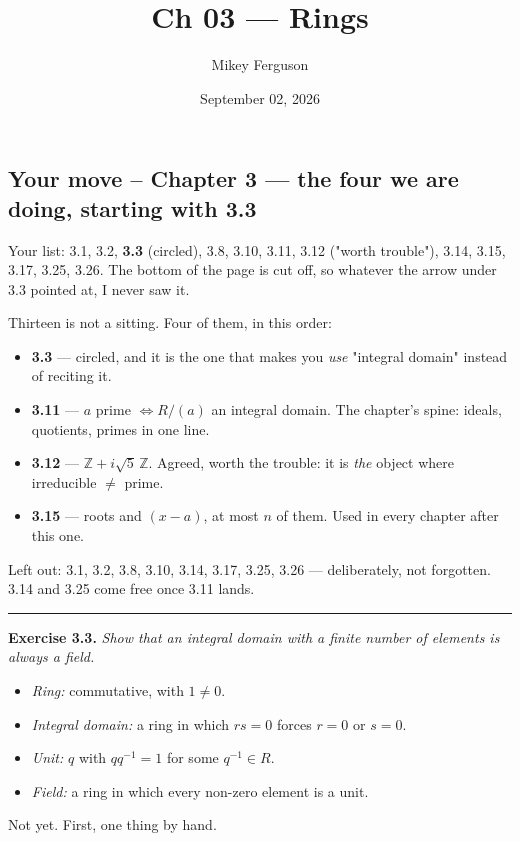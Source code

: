 \documentclass[11pt]{article}
\title{Ch 03 --- Rings}
\author{Mikey Ferguson}
\date{September 02, 2026}
\begin{document}
\maketitle
{}\subsection*{Your move -- Chapter 3 --- the four we are doing, starting with 3.3}
Your list: 3.1, 3.2, \textbf{3.3} (circled), 3.8, 3.10, 3.11, 3.12 ("worth trouble"), 3.14, 3.15, 3.17, 3.25, 3.26. The bottom of the page is cut off, so whatever the arrow under 3.3 pointed at, I never saw it.

Thirteen is not a sitting. Four of them, in this order:

\begin{itemize}
  \item \textbf{3.3} --- circled, and it is the one that makes you \emph{use} "integral domain" instead of reciting it.
  \item \textbf{3.11} --- $a$ prime $\iff R/(a)$ an integral domain. The chapter's spine: ideals, quotients, primes in one line.
  \item \textbf{3.12} --- $\mathbb{Z}+i\sqrt{5}\,\mathbb{Z}$. Agreed, worth the trouble: it is \emph{the} object where irreducible $\neq$ prime.
  \item \textbf{3.15} --- roots and $(x-a)$, at most $n$ of them. Used in every chapter after this one.
\end{itemize}

Left out: 3.1, 3.2, 3.8, 3.10, 3.14, 3.17, 3.25, 3.26 --- deliberately, not forgotten. 3.14 and 3.25 come free once 3.11 lands.

\medskip\hrule\medskip

\textbf{Exercise 3.3.} \emph{Show that an integral domain with a finite number of elements is always a field.}

\begin{itemize}
  \item \emph{Ring:} commutative, with $1 \neq 0$.
  \item \emph{Integral domain:} a ring in which $rs = 0$ forces $r = 0$ or $s = 0$.
  \item \emph{Unit:} $q$ with $qq^{-1} = 1$ for some $q^{-1} \in R$.
  \item \emph{Field:} a ring in which every non-zero element is a unit.
\end{itemize}

Not yet. First, one thing by hand.
\end{document}
